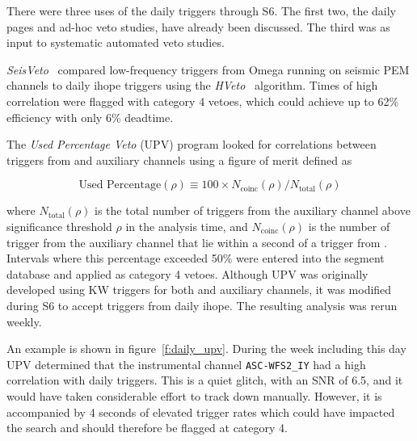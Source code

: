 
There were three uses of the daily triggers through S6.  The first
two, the daily pages and ad-hoc veto studies, have already been
discussed.  The third was as input to systematic automated veto
studies.

\emph{SeisVeto}~\cite{} compared low-frequency triggers from Omega
running on seismic PEM channels to daily ihope triggers using the
\emph{HVeto}~\cite{} algorithm.  Times of high correlation were
flagged with category 4 vetoes, which could achieve up to 62\%
efficiency with only 6\% deadtime.

The \emph{Used Percentage Veto} (UPV) program looked for correlations
between triggers from \darmerr and auxiliary channels using a figure
of merit defined as

\begin{equation*}
\textrm{Used Percentage}(\rho) \equiv 100 \times
N_\textrm{coinc}(\rho) / N_\textrm{total}(\rho)
\end{equation*}

where $N_\textrm{total}(\rho)$ is the total number of triggers from
the auxiliary channel above significance threshold $\rho$ in the
analysis time, and $N_\textrm{coinc}(\rho)$ is the number of trigger
from the auxiliary channel that lie within a second of a trigger from
\darmerr.  Intervals where this percentage exceeded 50\% were entered
into the segment database and applied as category 4 vetoes.  Although
UPV was originally developed using KW triggers for both \darmerr and
auxiliary channels, it was modified during S6 to accept triggers from
daily ihope.  The resulting analysis was rerun weekly.



An example is shown in figure~\ref{f:daily_upv}.  During the week
including this day UPV determined that the instrumental channel
\texttt{ASC-WFS2\_IY}  had a high correlation
with daily triggers.  This is a quiet glitch, with an SNR of 6.5, and
it would have taken considerable effort to track down manually.
However, it is accompanied by 4 seconds of elevated trigger rates
which could have impacted the search and should therefore be flagged
at category 4.

